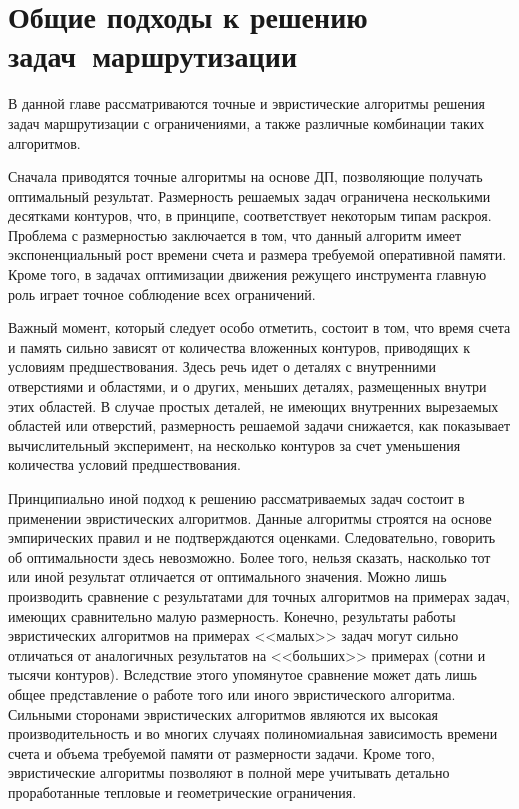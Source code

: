 
\section{
  Общие подходы
  к решению задач~маршрутизации
}
\label{sect:5.1}

В данной главе рассматриваются точные и эвристические алгоритмы решения задач
маршрутизации с ограничениями,
а также различные комбинации таких алгоритмов.

Сначала приводятся точные алгоритмы на основе ДП,
позволяющие получать оптимальный результат.
Размерность решаемых задач ограничена несколькими десятками контуров,
что, в принципе, соответствует некоторым типам раскроя.
Проблема с размерностью заключается в том,
что данный алгоритм имеет экспоненциальный рост времени счета
и размера требуемой оперативной памяти.
Кроме того, в задачах оптимизации движения режущего инструмента главную роль
играет точное соблюдение всех ограничений.

Важный момент, который следует особо отметить, состоит в том,
что время счета и память сильно зависят от количества вложенных контуров,
приводящих к условиям предшествования.
Здесь речь идет о деталях с внутренними отверстиями
и областями, и о других, меньших деталях, размещенных внутри этих областей.
В случае простых деталей, не имеющих внутренних вырезаемых областей или отверстий,
размерность решаемой задачи снижается,
как показывает вычислительный эксперимент,
на несколько контуров за счет уменьшения количества условий предшествования.

Принципиально иной подход к решению рассматриваемых задач состоит в применении
эвристических алгоритмов.
Данные алгоритмы строятся на основе эмпирических правил и не подтверждаются оценками.
Следовательно, говорить об оптимальности здесь невозможно.
Более того, нельзя сказать,
насколько тот или иной результат отличается от оптимального значения.
Можно лишь производить сравнение с результатами
для точных алгоритмов на примерах задач, имеющих сравнительно малую размерность.
Конечно, результаты работы эвристических алгоритмов на примерах <<малых>>
задач могут сильно отличаться от аналогичных результатов на <<больших>> примерах
(сотни и тысячи контуров).
Вследствие этого упомянутое сравнение может дать лишь
общее представление о работе того или иного эвристического алгоритма.
Сильными сторонами эвристических алгоритмов являются их высокая производительность
и во многих случаях полиномиальная зависимость времени счета и объема
требуемой памяти от размерности задачи.
Кроме того, эвристические алгоритмы позволяют в полной мере учитывать
детально проработанные тепловые и геометрические ограничения.

